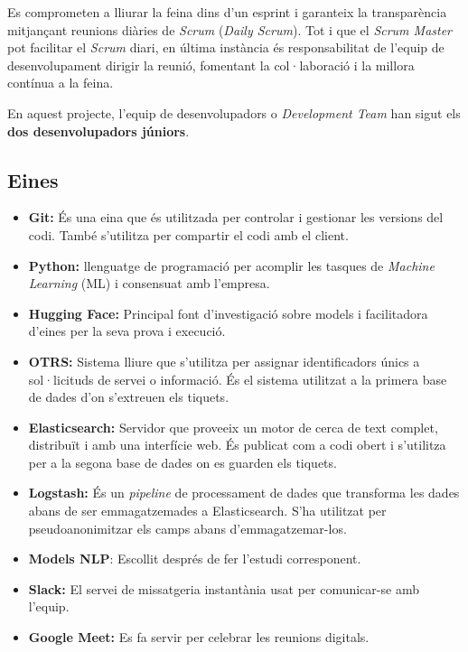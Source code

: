 Es comprometen a lliurar la feina dins d'un esprint i garanteix la transparència mitjançant reunions diàries de \textit{Scrum} (\textit{Daily Scrum}). Tot i que el \textit{Scrum Master} pot facilitar el \textit{Scrum} diari, en última instància és responsabilitat de l'equip de desenvolupament dirigir la reunió, fomentant la col·laboració i la millora contínua a la feina.

En aquest projecte, l'equip de desenvolupadors o \textit{Development Team} han sigut els \textbf{dos desenvolupadors júniors}.






\subsection{Eines}

\begin{itemize}
    \item \textbf{Git:} És una eina que és utilitzada per controlar i gestionar les versions del codi. També s'utilitza per compartir el codi amb el client.
    \item \textbf{Python:} llenguatge de programació per acomplir les tasques de \textit{Machine Learning} (ML) i consensuat amb l'empresa.
    \item \textbf{Hugging Face:} Principal font d'investigació sobre models i facilitadora d'eines per la seva prova i execució.
    \item \textbf{OTRS:} Sistema lliure que s'utilitza per assignar identificadors únics a sol·licituds de servei o informació. És el sistema utilitzat a la primera base de dades d'on s'extreuen els tiquets.
    \item \textbf{Elasticsearch:} Servidor que proveeix un motor de cerca de text complet, distribuït i amb una interfície web. És publicat com a codi obert i s'utilitza per a la segona base de dades on es guarden els tiquets.
    \item \textbf{Logstash:} És un \textit{pipeline} de processament de dades que transforma les dades abans de ser emmagatzemades a Elasticsearch. S'ha utilitzat per pseudoanonimitzar els camps abans d'emmagatzemar-los.
    \item \textbf{Models NLP\cite{Hugging-Face}}: Escollit després de fer l'estudi corresponent.
    \item \textbf{Slack:} El servei de missatgeria instantània usat per comunicar-se amb l'equip.
    \item \textbf{Google Meet:} Es fa servir per celebrar les reunions digitals.
\end{itemize}